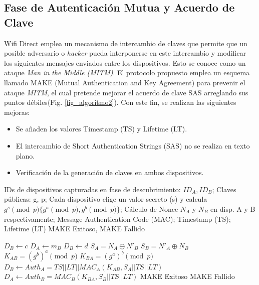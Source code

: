 \documentclass[conference,a4paper,onecolumn,11pt]{IEEEtran} %
\begin{document}
\subsection{Fase de Autenticación Mutua y Acuerdo de Clave}
Wifi Direct emplea un mecanismo de intercambio de claves que permite que un posible adversario o \textit{hacker} pueda interponerse en este intercambio y modificar los siguientes mensajes enviados entre los dispositivos. Esto se conoce como un ataque \textit{Man in the Middle (MITM)}.
El protocolo propuesto emplea un esquema llamado MAKE (Mutual Authentication and Key Agreement) para prevenir el ataque \textit{MITM}, el cual pretende mejorar el acuerdo de clave SAS arreglando sus puntos débiles(Fig. \ref{fig_algoritmo2}).
Con este fin, se realizan las siguientes mejoras:
\begin{itemize}
    \item Se añaden los valores Timestamp (TS) y Lifetime (LT).
    \item El intercambio de Short Authentication Strings (SAS) no se realiza en texto plano.
    \item Verificación de la generación de claves en ambos dispositivos.
\end{itemize}

\begin{algorithm}
\caption{MAKE - Mutual Authentication and Secret Key Establishment}\begin{algorithmic}[1]
    \Require IDs de dispositivos capturadas en fase de descubrimiento: $ID_A, ID_B$; Claves públicas: g, p; Cada dispositivo elige un valor secreto (s) y calcula $g^s \pmod p \{g^a \pmod p, g^b \pmod p\}$; Cálculo de Nonce $N_A$ y $N_B$ en disp. A y B respectivamente; Message Authentication Code (MAC); Timestamp (TS); Lifetime (LT)
    \Ensure MAKE Exitoso, MAKE Fallido
    
    \State $D_B \leftarrow c$ 
    \State $D_A \leftarrow m_B$ 
    \State $D_B \leftarrow d$ 
    \State $S_A = N_A \oplus N'_B$ 
    \State $S_B = N'_A \oplus N_B$ 
    \State $K_{AB} = (g^b)^a \pmod p$ 
    \State $K_{BA} = (g^a)^b \pmod p$ 
    \State $D_B \leftarrow Auth_A = TS || LT || MAC_A(K_{AB}, S_A || TS || LT)$
    \State $D_A \leftarrow Auth_B = MAC_B(K_{BA}, S_B || TS || LT)$
     
        \State MAKE Exitoso
    \Else
        \State MAKE Fallido
    \EndIf
    \label{fig_algoritmo2}
\end{algorithmic}
\end{algorithm}
\end{document}
